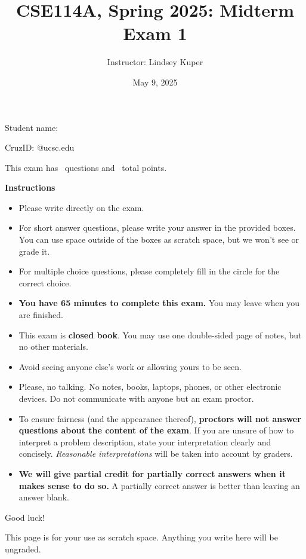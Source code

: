 \documentclass[addpoints]{exam}
\title{CSE114A, Spring 2025: Midterm Exam 1}
\author{Instructor: Lindsey Kuper}
\date{May 9, 2025}
\begin{document}
\maketitle

\begin{coverpages}

\bigskip  

\noindent Student name: \hrulefill

\bigskip
\bigskip

\noindent CruzID: \hrulefill @ucsc.edu

\bigskip
\bigskip

\noindent This exam has \numquestions~questions and \numpoints~total points.

\bigskip
\bigskip

\noindent \textbf{Instructions}

\begin{itemize}
\item Please write directly on the exam.
\item For short answer questions, please write your answer in the provided boxes.  You can use space outside of the boxes as scratch space, but we won't see or grade it.
\item For multiple choice questions, please completely fill in the circle for the correct choice.
\item \textbf{You have 65 minutes to complete this exam.} You may leave when you are finished.
\item This exam is \textbf{closed book}.  You may use one double-sided page of notes, but no other materials.
\item Avoid seeing anyone else's work or allowing yours to be seen.
\item Please, no talking.  No notes, books, laptops, phones, or other electronic devices. Do not communicate with anyone but an exam proctor.
\item To ensure fairness (and the appearance thereof),
  \textbf{proctors will not answer questions about the content of the exam}. If you are unsure 
  of how to interpret a problem description, state your interpretation clearly and concisely. 
  \textit{Reasonable interpretations} will be taken into account by graders.
\item \textbf{We will give partial credit for partially correct answers when it makes sense to do so.} A partially correct answer is better than leaving an answer blank.
\end{itemize}
  
\bigskip

\noindent Good luck!

\newpage

This page is for your use as scratch space. Anything you write here will be ungraded.

\newpage  

\end{coverpages}
\end{document}
